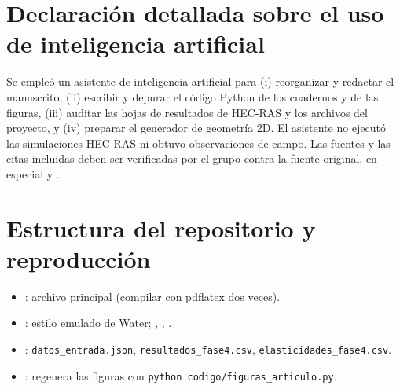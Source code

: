 \appendix
\section{Declaración detallada sobre el uso de inteligencia artificial}\label{anx:ia}
Se empleó un asistente de inteligencia artificial para (i) reorganizar y redactar el manuscrito, (ii) escribir y depurar el código Python de los cuadernos y de las figuras, (iii) auditar las hojas de resultados de HEC-RAS y los archivos del proyecto, y (iv) preparar el generador de geometría 2D. El asistente no ejecutó las simulaciones HEC-RAS ni obtuvo observaciones de campo. Las fuentes y las citas incluidas deben ser verificadas por el grupo contra la fuente original, en especial \citet{gumgum2025} y \citet{hsu2002}.

\section{Estructura del repositorio y reproducción}
\begin{itemize}
\item {}: archivo principal (compilar con pdflatex dos veces).
\item {}: estilo emulado de Water; , , .
\item {}: \texttt{datos\_entrada.json}, \texttt{resultados\_fase4.csv}, \texttt{elasticidades\_fase4.csv}.
\item {}: regenera las figuras con \texttt{python codigo/figuras\_articulo.py}.
\end{itemize}

